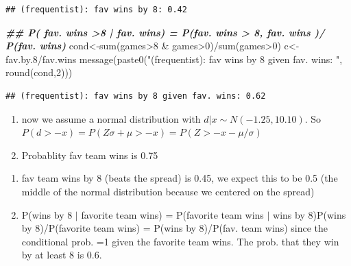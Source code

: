 \documentclass[
]{book}
\newenvironment{Shaded}{\begin{snugshade}}{\end{snugshade}}
\newcommand{\DecValTok}[1]{\textcolor[rgb]{0.00,0.00,0.81}{#1}}
\newcommand{\DocumentationTok}[1]{\textcolor[rgb]{0.56,0.35,0.01}{\textbf{\textit{#1}}}}
\newcommand{\FloatTok}[1]{\textcolor[rgb]{0.00,0.00,0.81}{#1}}
\newcommand{\FunctionTok}[1]{\textcolor[rgb]{0.00,0.00,0.00}{#1}}
\newcommand{\NormalTok}[1]{#1}
\newcommand{\OtherTok}[1]{\textcolor[rgb]{0.56,0.35,0.01}{#1}}
\newcommand{\SpecialCharTok}[1]{\textcolor[rgb]{0.00,0.00,0.00}{#1}}
\newcommand{\StringTok}[1]{\textcolor[rgb]{0.31,0.60,0.02}{#1}}
\providecommand{\tightlist}{%
  \setlength{\itemsep}{0pt}\setlength{\parskip}{0pt}}
\theoremstyle{definition}
\theoremstyle{definition}
\theoremstyle{definition}
\theoremstyle{definition}
\theoremstyle{remark}
\begin{document}
\begin{verbatim}
## (frequentist): fav wins by 8: 0.42
\end{verbatim}

\begin{Shaded}
\begin{Highlighting}[]
  \DocumentationTok{\#\# P( fav. wins \textgreater{}8 | fav. wins) = P(fav. wins \textgreater{} 8, fav. wins )/ P(fav. wins)}
\NormalTok{ cond}\OtherTok{\textless{}{-}}\FunctionTok{sum}\NormalTok{(games}\SpecialCharTok{\textgreater{}}\DecValTok{8} \SpecialCharTok{\&}\NormalTok{ games}\SpecialCharTok{\textgreater{}}\DecValTok{0}\NormalTok{)}\SpecialCharTok{/}\FunctionTok{sum}\NormalTok{(games}\SpecialCharTok{\textgreater{}}\DecValTok{0}\NormalTok{)   }
\NormalTok{  c}\OtherTok{\textless{}{-}}\NormalTok{fav.by}\FloatTok{.8}\SpecialCharTok{/}\NormalTok{fav.wins}
 \FunctionTok{message}\NormalTok{(}\FunctionTok{paste0}\NormalTok{(}\StringTok{"(frequentist): fav wins by 8 given fav. wins: "}\NormalTok{, }\FunctionTok{round}\NormalTok{(cond,}\DecValTok{2}\NormalTok{)))}
\end{Highlighting}
\end{Shaded}

\begin{verbatim}
## (frequentist): fav wins by 8 given fav. wins: 0.62
\end{verbatim}

\begin{enumerate}
\def\labelenumi{(\alph{enumi})}
\setcounter{enumi}{1}
\tightlist
\item
  now we assume a normal distribution with \(d|x \sim N(-1.25, 10.10)\). So \(P(d > -x)= P(Z\sigma+\mu > -x)=P(Z > -x-\mu / \sigma)\)
\item
  Probablity fav team wins is 0.75
\end{enumerate}

\begin{enumerate}
\def\labelenumi{(\roman{enumi})}
\setcounter{enumi}{1}
\tightlist
\item
  fav team wins by 8 (beats the spread) is 0.45, we expect this to be 0.5 (the middle of the normal distribution because we centered on the spread)
\item
  P(wins by 8 \(|\) favorite team wins) = P(favorite team wins \(|\) wins by 8)P(wins by 8)/P(favorite team wins) = P(wins by 8)/P(fav. team wins) since the conditional prob. =1 given the favorite team wins. The prob. that they win by at least 8 is 0.6.
\end{enumerate}
\end{document}

